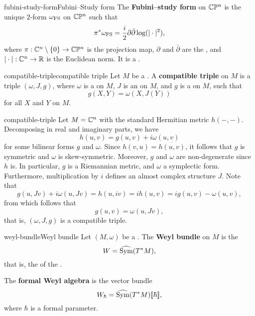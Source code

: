 \begin{topic}{fubini-study-form}{Fubini--Study form}
    The \textbf{Fubini--study form} on $\mathbb{C} \mathbb{P}^n$ is the unique $2$-form $\omega_\textup{FS}$ on $\mathbb{C} \mathbb{P}^n$ such that
    \[ \pi^* \omega_\textup{FS} = \frac{i}{2} \partial \bar{\partial} \log (|\cdot|^2) , \]
    where $\pi : \mathbb{C}^n \setminus \{ 0 \} \to \mathbb{C} \mathbb{P}^n$ is the projection map, $\partial$ and $\bar{\partial}$ are the , and $|\cdot| : \mathbb{C}^n \to \mathbb{R}$ is the Euclidean norm. It is a .
\end{topic}

\begin{topic}{compatible-triple}{compatible triple}
    Let $M$ be a . A \textbf{compatible triple} on $M$ is a triple $(\omega, J, g)$, where $\omega$ is a  on $M$, $J$ is an  on $M$, and $g$ is a  on $M$, such that
    \[ g(X, Y) = \omega(X, J(Y)) \]
    for all  $X$ and $Y$ on $M$.
\end{topic}

\begin{example}{compatible-triple}
    Let $M = \mathbb{C}^n$ with the standard Hermitian metric $h(-, -)$. Decomposing in real and imaginary parts, we have
    \[ h(u, v) = g(u, v) + i \omega(u, v) \]
    for some bilinear forms $g$ and $\omega$. Since $h(v, u) = \overline{h(u, v)}$, it follows that $g$ is symmetric and $\omega$ is skew-symmetric. Moreover, $g$ and $\omega$ are non-degenerate since $h$ is. In particular, $g$ is a Riemannian metric, and $\omega$ a symplectic form. Furthermore, multiplication by $i$ defines an almost complex structure $J$. Note that
    \[ g(u, Jv) + i \omega(u, Jv) = h(u, iv) = i h(u, v) = i g(u, v) - \omega(u, v) , \]
    from which follows that
    \[ g(u, v) = \omega(u, Jv) , \]
    that is, $(\omega, J, g)$ is a compatible triple.
\end{example}

\begin{topic}{weyl-bundle}{Weyl bundle}
    Let $(M, \omega)$ be a . The \textbf{Weyl bundle} on $M$ is the 
    \[ W = \widehat{\textup{Sym}}(T^*M) , \]
    that is, the   of the .
    
    The \textbf{formal Weyl algebra} is the vector bundle
    \[ W_\hbar = \widehat{\textup{Sym}}(T^*M) \llbracket \hbar \rrbracket , \]
    where $\hbar$ is a formal parameter.
\end{topic}

